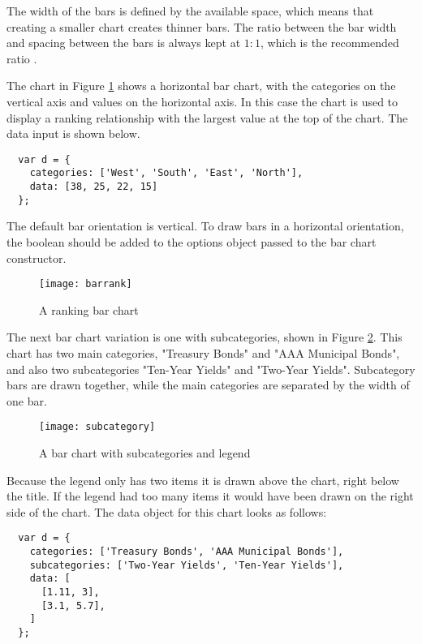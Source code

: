 The width of the bars is defined by the available space, which means that creating a smaller chart creates thinner bars. The ratio between the bar width and spacing between the bars is always kept at $1:1$, which is the recommended ratio \cite{few04}.

The chart in Figure \ref{rankingbar} shows a horizontal bar chart, with the categories on the vertical axis and values on the horizontal axis. In this case the chart is used to display a ranking relationship with the largest value at the top of the chart. The data input is shown below.

\begin{verbatim}
  var d = {
    categories: ['West', 'South', 'East', 'North'],
    data: [38, 25, 22, 15]
  };
\end{verbatim}

The default bar orientation is vertical. To draw bars in a horizontal orientation, the  boolean should be added to the options object passed to the bar chart constructor.

\begin{figure}[H]
	\centering
	\texttt{[image: barrank]}
	\caption{A ranking bar chart}
	\label{rankingbar}
\end{figure}

The next bar chart variation is one with subcategories, shown in Figure \ref{subcategory}. This chart has two main categories, "Treasury Bonds" and "AAA Municipal Bonds", and also two subcategories "Ten-Year Yields" and "Two-Year Yields". Subcategory bars are drawn together, while the main categories are separated by the width of one bar.

\begin{figure}[H]
	\centering
	\texttt{[image: subcategory]}
	\caption{A bar chart with subcategories and legend}
	\label{subcategory}
\end{figure}

Because the legend only has two items it is drawn above the chart, right below the title. If the legend had too many items it would have been drawn on the right side of the chart. The data object for this chart looks as follows:

\begin{verbatim}
  var d = {
    categories: ['Treasury Bonds', 'AAA Municipal Bonds'],
    subcategories: ['Two-Year Yields', 'Ten-Year Yields'],
    data: [
      [1.11, 3],
      [3.1, 5.7],
    ]
  };
\end{verbatim}

